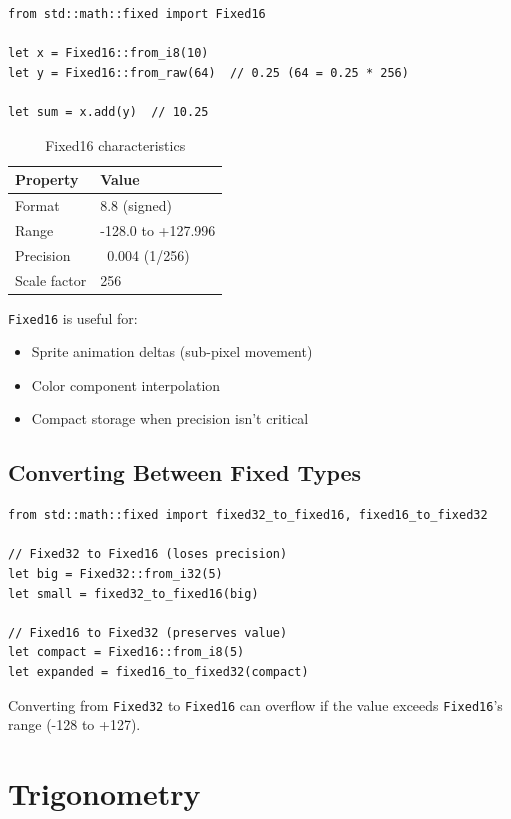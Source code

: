 \begin{lstlisting}
from std::math::fixed import Fixed16

let x = Fixed16::from_i8(10)
let y = Fixed16::from_raw(64)  // 0.25 (64 = 0.25 * 256)

let sum = x.add(y)  // 10.25
\end{lstlisting}

\begin{table}[h]
\centering
\begin{tabular}{ll}
\textbf{Property} & \textbf{Value} \\
\hline
Format & 8.8 (signed) \\
Range & -128.0 to +127.996 \\
Precision & ~0.004 (1/256) \\
Scale factor & 256 \\
\end{tabular}
\caption{Fixed16 characteristics}
\end{table}

\texttt{Fixed16} is useful for:
\begin{itemize}
\item Sprite animation deltas (sub-pixel movement)
\item Color component interpolation
\item Compact storage when precision isn't critical
\end{itemize}

\subsection{Converting Between Fixed Types}

\begin{lstlisting}
from std::math::fixed import fixed32_to_fixed16, fixed16_to_fixed32

// Fixed32 to Fixed16 (loses precision)
let big = Fixed32::from_i32(5)
let small = fixed32_to_fixed16(big)

// Fixed16 to Fixed32 (preserves value)
let compact = Fixed16::from_i8(5)
let expanded = fixed16_to_fixed32(compact)
\end{lstlisting}

\begin{warningbox}
Converting from \texttt{Fixed32} to \texttt{Fixed16} can overflow if the value exceeds \texttt{Fixed16}'s range (-128 to +127).
\end{warningbox}

\section{Trigonometry}
\label{sec:math-trig}

